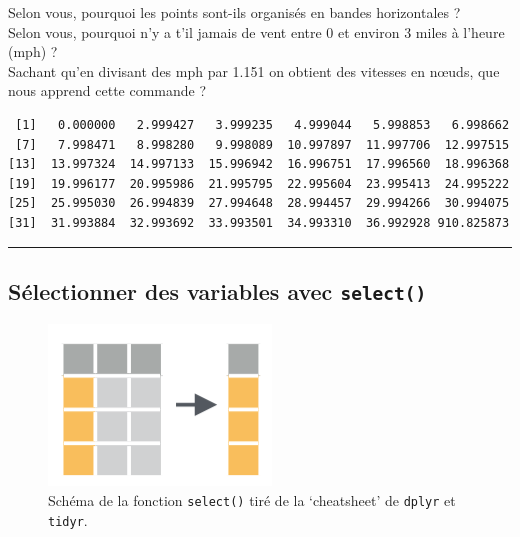 \documentclass[
  a4paper,
]{article}
\newenvironment{Shaded}{\begin{snugshade}}{\end{snugshade}}
\newcommand{\FloatTok}[1]{\textcolor[rgb]{0.69,0.50,0.00}{#1}}
\newcommand{\KeywordTok}[1]{\textcolor[rgb]{0.12,0.11,0.11}{\textbf{#1}}}
\newcommand{\NormalTok}[1]{\textcolor[rgb]{0.12,0.11,0.11}{#1}}
\newcommand{\OperatorTok}[1]{\textcolor[rgb]{0.12,0.11,0.11}{#1}}
\begin{document}
Selon vous, pourquoi les points sont-ils organisés en bandes horizontales ?\\
Selon vous, pourquoi n'y a t'il jamais de vent entre 0 et environ 3 miles à l'heure (mph) ?\\
Sachant qu'en divisant des mph par 1.151 on obtient des vitesses en nœuds, que nous apprend cette commande ?

\begin{Shaded}
\end{Shaded}

\begin{verbatim}
 [1]   0.000000   2.999427   3.999235   4.999044   5.998853   6.998662
 [7]   7.998471   8.998280   9.998089  10.997897  11.997706  12.997515
[13]  13.997324  14.997133  15.996942  16.996751  17.996560  18.996368
[19]  19.996177  20.995986  21.995795  22.995604  23.995413  24.995222
[25]  25.995030  26.994839  27.994648  28.994457  29.994266  30.994075
[31]  31.993884  32.993692  33.993501  34.993310  36.992928 910.825873
\end{verbatim}

\begin{center}\rule{0.5\linewidth}{0.5pt}\end{center}

\hypertarget{suxe9lectionner-des-variables-avec-select}{%
\subsection{\texorpdfstring{Sélectionner des variables avec \texttt{select()}}{Sélectionner des variables avec select()}}\label{suxe9lectionner-des-variables-avec-select}}

\begin{figure}[htpb]

{\centering \includegraphics[width=0.5\linewidth]{images/select} 

}

\caption{Schéma de la fonction \texttt{select()} tiré de la `cheatsheet' de \texttt{dplyr} et \texttt{tidyr}.}\label{fig:selectfig}
\end{figure}
\end{document}
